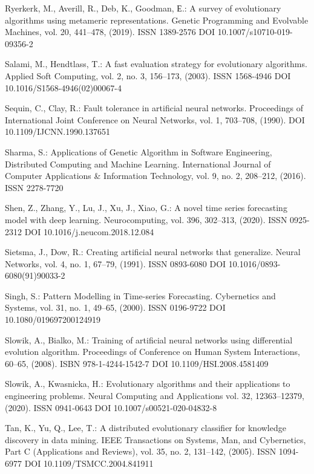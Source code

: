 \begin{thebibliography}{99.}
 Ryerkerk, M., Averill, R., Deb, K., Goodman, Е.: A survey of evolutionary algorithms using metameric representations. Genetic Programming and Evolvable Machines, vol. 20, 441--478, (2019). ISSN 1389-2576 DOI 10.1007/s10710-019-09356-2

 Salami, M., Hendtlass, T.: A fast evaluation strategy for evolutionary algorithms. Applied Soft Computing, vol. 2, no. 3, 156--173, (2003). ISSN 1568-4946 DOI 10.1016/S1568-4946(02)00067-4

 Sequin, C., Clay, R.: Fault tolerance in artificial neural networks. Proceedings of International Joint Conference on Neural Networks, vol. 1, 703--708, (1990). DOI 10.1109/IJCNN.1990.137651

 Sharma, S.: Applications of Genetic Algorithm in Software Engineering, Distributed Computing and Machine Learning. International Journal of Computer Applications \& Information Technology, vol. 9, no. 2, 208--212, (2016). ISSN 2278-7720

 Shen, Z., Zhang, Y., Lu, J., Xu, J., Xiao, G.: A novel time series forecasting model with deep learning. Neurocomputing, vol. 396, 302--313, (2020). ISSN 0925-2312 DOI 10.1016/j.neucom.2018.12.084

 Sietsma, J., Dow, R.: Creating artificial neural networks that generalize. Neural Networks, vol. 4, no. 1, 67--79, (1991). ISSN 0893-6080 DOI 10.1016/0893-6080(91)90033-2

 Singh, S.: Pattern Modelling in Time-series Forecasting. Cybernetics and Systems, vol. 31, no. 1, 49--65, (2000). ISSN 0196-9722 DOI 10.1080/019697200124919

 Slowik, A., Bialko, M.: Training of artificial neural networks using differential evolution algorithm. Proceedings of Conference on Human System Interactions, 60--65, (2008). ISBN 978-1-4244-1542-7 DOI 10.1109/HSI.2008.4581409

 Slowik, A., Kwasnicka, H.: Evolutionary algorithms and their applications to engineering problems. Neural Computing and Applications vol. 32, 12363--12379, (2020). ISSN 0941-0643 DOI 10.1007/s00521-020-04832-8

 Tan, K., Yu, Q., Lee, T.: A distributed evolutionary classifier for knowledge discovery in data mining. IEEE Transactions on Systems, Man, and Cybernetics, Part C (Applications and Reviews), vol. 35, no. 2, 131--142, (2005). ISSN 1094-6977 DOI 10.1109/TSMCC.2004.841911


\end{thebibliography}
